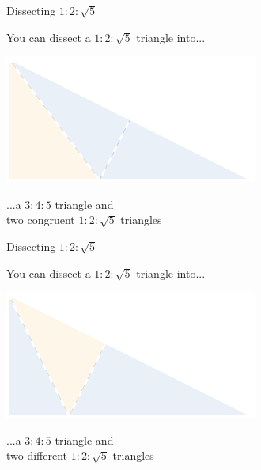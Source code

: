 \documentclass[14pt]{beamer}
\begin{document}

    \begin{frame}{Dissecting $1\!\!:\!\!2\!\!:\!\!\sqrt{5}$}
        \begin{center}
            You can dissect a $1\!\!:\!\!2\!\!:\!\!\sqrt{5}$ triangle into...

            \bigskip \bigskip

            \includegraphics[height=18ex]{figures/figure006e.pdf}

            \bigskip \bigskip

            ...a $3\!\!:\!\!4\!\!:\!\!5$ triangle and\\two congruent $1\!\!:\!\!2\!\!:\!\!\sqrt{5}$ triangles
        \end{center}
    \end{frame}


    \begin{frame}{Dissecting $1\!\!:\!\!2\!\!:\!\!\sqrt{5}$}
        \begin{center}
            You can dissect a $1\!\!:\!\!2\!\!:\!\!\sqrt{5}$ triangle into...

            \bigskip \bigskip

            \includegraphics[height=18ex]{figures/figure006i.pdf}

            \bigskip \bigskip

            ...a $3\!\!:\!\!4\!\!:\!\!5$ triangle and\\two different $1\!\!:\!\!2\!\!:\!\!\sqrt{5}$ triangles
        \end{center}
    \end{frame}
\end{document}
